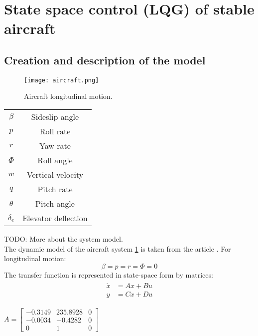 \documentclass[../report.tex]{subfiles}
\begin{document}
\section{State space control (LQG) of stable aircraft}
\subsection{Creation and description of the model}

\begin{figure}[h]
    \centering
    \texttt{[image: aircraft.png]}
    \caption{Aircraft longitudinal motion.}
    \label{fig:aircraft}
\end{figure}

\begin{tabular}{ |c|c| }
    \hline
    $\beta$ & Sideslip angle \\
    $p$ & Roll rate\\
    $r$ & Yaw rate\\
    $\Phi$ & Roll angle\\
    $w$ & Vertical velocity\\
    $q$ & Pitch rate\\
    $\theta$ & Pitch angle\\
    $\delta_e$ & Elevator deflection\\
    \hline
\end{tabular}

TODO: More about the system model. \\

The dynamic model of the aircraft system \ref{fig:aircraft} is taken from
the article \cite{air_lqg}.
For longitudinal motion:
\begin{equation}
    \beta = p = r =\Phi = 0
\end{equation}
The transfer function is represented in state-space form by matrices:
\begin{align} \label{sys_ss}
    \begin{split}
        \dot{x} &= Ax + Bu \\
        y &= Cx + Du
    \end{split}
\end{align}

$A = \begin{bmatrix} -0.3149 & 235.8928 & 0 \\
                     -0.0034 & -0.4282  & 0 \\
                      0      & 1        & 0 \end{bmatrix}$ \\
\end{document}
